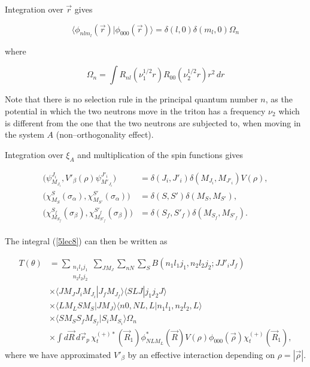 \begin{subappendices}
Integration over $\vec r$ gives

\begin{equation}\label{5lec12}
\langle \phi_{n l m_l}(\vec r) | \phi_{000}(\vec r) \rangle = \delta(l,0) \delta(m_l,0) \Omega_n
\end{equation}

where


\begin{equation}\label{5lec13}
\Omega_n=\int R_{n l} (\nu_1^{1/2} r)R_{00} (\nu_2^{1/2} r) r^2\, dr
\end{equation}


Note that there is no selection rule in the principal quantum number $n$, as the potential in which the two neutrons move in the triton has a frequency $\nu_2$ which is different from the one that the two neutrons are subjected to, when moving in the system $A$ (non--orthogonality effect).


Integration over $\xi_A$ and multiplication of the spin functions gives

\begin{equation}\label{5lec14}
\begin{split}
\bigl( \psi_{M_{J_i}}^{J_i},V'_\beta(\rho) \psi_{M'_{J_i}}^{J'_i}\bigr)&= \delta(J_i,J'_i)
\delta(M_{J_i},M_{J'_i})V(\rho),\\
\bigl( \chi_{M_S}^{S}(\sigma_\alpha),\chi_{M_{S'}}^{S'}(\sigma_\alpha)\bigr)&= \delta(S,S')
\delta(M_S,M_{S'}),\\
\bigl( \chi_{M_{S_f}}^{S_f}(\sigma_\beta),\chi_{M_{S'_f}}^{S'_f}(\sigma_\beta)\bigr)&= \delta(S_f,S'_f)
\delta(M_{S_f},M_{S'_f}).\\
\end{split}
\end{equation}

The integral (\ref{5lec8}) can then be written as


\begin{equation}\label{5lec15}
\begin{split}
T(\theta)&= \sum_{\substack{n_1 l_1 j_1\\n_2 l_2 j_2}}\sum_{J M_J}\sum_{nN}\sum_{S}B(n_1 l_1 j_1,n_2 l_2 j_2;JJ'_i J_f)\\
&\times \langle J M_J J_i M_{J_i}|J_f M_{J_f} \rangle \langle SLJ|j_1 j_2 J \rangle \\
&\times \langle L M_L S M_{S}|J M_{J} \rangle \langle n0,NL,L|n_1 l_1,n_2 l_2,L \rangle \\
&\times \langle S M_S S_f M_{S_f}|S_i M_{S_i}\rangle \Omega_n \\
&\times \int d\vec R\,d\vec r_p\, \chi^{(+)*}_t(\vec R_1) \phi^*_{NLM_L}(\vec R) V(\rho) \phi_{000}(\vec \rho) \chi^{(+)}_t(\vec R_1),
\end{split}
\end{equation}
where we have approximated $V'_\beta$ by an effective interaction depending on $\rho=|\vec \rho|$.


\end{subappendices}
